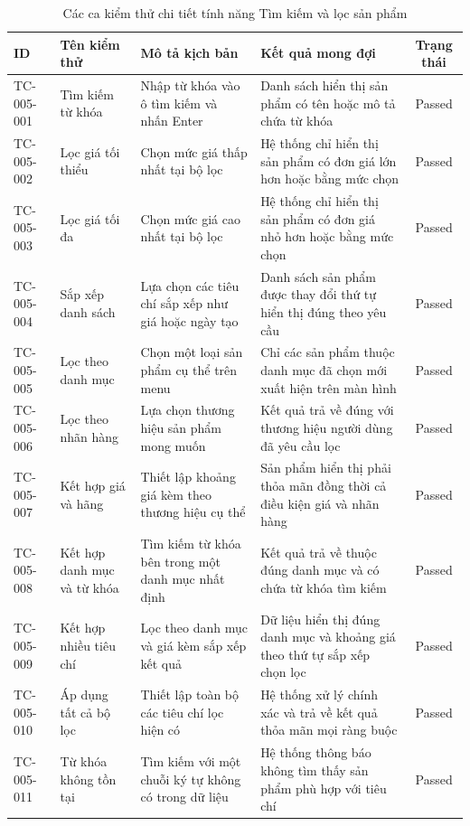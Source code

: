 \begin{table}[H]
\centering
\caption{Các ca kiểm thử chi tiết tính năng Tìm kiếm và lọc sản phẩm}
\label{tab:tc_filter_full}
\small
\begin{tabularx}{\textwidth}{|l|X|X|X|c|}
\hline
\textbf{ID} & \textbf{Tên kiểm thử} & \textbf{Mô tả kịch bản} & \textbf{Kết quả mong đợi} & \textbf{Trạng thái} \\ \hline
TC-005-001 & Tìm kiếm từ khóa & Nhập từ khóa vào ô tìm kiếm và nhấn Enter & Danh sách hiển thị sản phẩm có tên hoặc mô tả chứa từ khóa & Passed \\ \hline
TC-005-002 & Lọc giá tối thiểu & Chọn mức giá thấp nhất tại bộ lọc & Hệ thống chỉ hiển thị sản phẩm có đơn giá lớn hơn hoặc bằng mức chọn & Passed \\ \hline
TC-005-003 & Lọc giá tối đa & Chọn mức giá cao nhất tại bộ lọc & Hệ thống chỉ hiển thị sản phẩm có đơn giá nhỏ hơn hoặc bằng mức chọn & Passed \\ \hline
TC-005-004 & Sắp xếp danh sách & Lựa chọn các tiêu chí sắp xếp như giá hoặc ngày tạo & Danh sách sản phẩm được thay đổi thứ tự hiển thị đúng theo yêu cầu & Passed \\ \hline
TC-005-005 & Lọc theo danh mục & Chọn một loại sản phẩm cụ thể trên menu & Chỉ các sản phẩm thuộc danh mục đã chọn mới xuất hiện trên màn hình & Passed \\ \hline
TC-005-006 & Lọc theo nhãn hàng & Lựa chọn thương hiệu sản phẩm mong muốn & Kết quả trả về đúng với thương hiệu người dùng đã yêu cầu lọc & Passed \\ \hline
TC-005-007 & Kết hợp giá và hãng & Thiết lập khoảng giá kèm theo thương hiệu cụ thể & Sản phẩm hiển thị phải thỏa mãn đồng thời cả điều kiện giá và nhãn hàng & Passed \\ \hline
TC-005-008 & Kết hợp danh mục và từ khóa & Tìm kiếm từ khóa bên trong một danh mục nhất định & Kết quả trả về thuộc đúng danh mục và có chứa từ khóa tìm kiếm & Passed \\ \hline
TC-005-009 & Kết hợp nhiều tiêu chí & Lọc theo danh mục và giá kèm sắp xếp kết quả & Dữ liệu hiển thị đúng danh mục và khoảng giá theo thứ tự sắp xếp chọn lọc & Passed \\ \hline
TC-005-010 & Áp dụng tất cả bộ lọc & Thiết lập toàn bộ các tiêu chí lọc hiện có & Hệ thống xử lý chính xác và trả về kết quả thỏa mãn mọi ràng buộc & Passed \\ \hline
TC-005-011 & Từ khóa không tồn tại & Tìm kiếm với một chuỗi ký tự không có trong dữ liệu & Hệ thống thông báo không tìm thấy sản phẩm phù hợp với tiêu chí & Passed \\ \hline

\end{tabularx}
\end{table}
